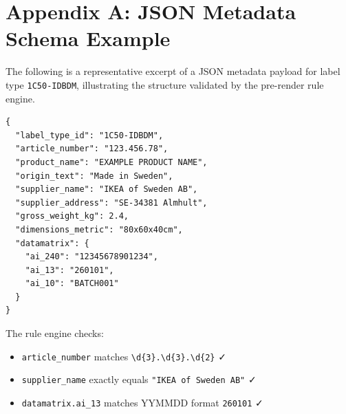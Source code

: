 \chapter{Appendix A: JSON Metadata Schema Example}
\label{app:schema}

The following is a representative excerpt of a JSON metadata payload for label type
\texttt{1C50-IDBDM}, illustrating the structure validated by the pre-render rule engine.

\begin{lstlisting}[language={},
  caption={Excerpt from a JSON metadata payload (anonymised).},
  label={lst:json_example}]
{
  "label_type_id": "1C50-IDBDM",
  "article_number": "123.456.78",
  "product_name": "EXAMPLE PRODUCT NAME",
  "origin_text": "Made in Sweden",
  "supplier_name": "IKEA of Sweden AB",
  "supplier_address": "SE-34381 Almhult",
  "gross_weight_kg": 2.4,
  "dimensions_metric": "80x60x40cm",
  "datamatrix": {
    "ai_240": "12345678901234",
    "ai_13": "260101",
    "ai_10": "BATCH001"
  }
}
\end{lstlisting}

\noindent The rule engine checks:
\begin{itemize}
  \item \texttt{article\_number} matches \texttt{\textbackslash d\{3\}.\textbackslash d\{3\}.\textbackslash d\{2\}} ✓
  \item \texttt{supplier\_name} exactly equals \texttt{"IKEA of Sweden AB"} ✓
  \item \texttt{datamatrix.ai\_13} matches YYMMDD format \texttt{260101} ✓
\end{itemize}
